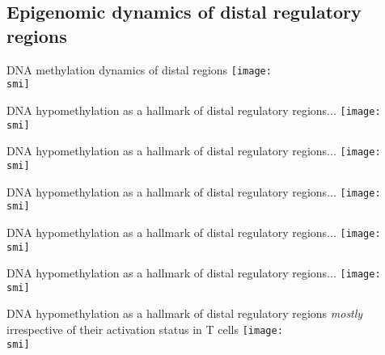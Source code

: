 \documentclass[10pt]{beamer}
\def\smi{out/ln/updir/mw-gcthesis-oral/library.bib}
\begin{document}
\subsection{Epigenomic dynamics of distal regulatory regions}
\begin{frame}{DNA methylation dynamics of distal regions}
  \def\smi{out/ln/updir/mw-gcthesis-oral/ink/hypometh-clusters/1.pdf}
  \texttt{[image: \\smi]}
\end{frame}
\begin{frame}{DNA hypomethylation as a hallmark of distal regulatory regions...}
  \def\smi{out/ln/updir/mw-gcthesis-oral/ink/hypometh-clusters/2.pdf}
  \texttt{[image: \\smi]}%
\end{frame}
\begin{frame}{DNA hypomethylation as a hallmark of distal regulatory regions...}
  \def\smi{out/ln/updir/mw-gcthesis-oral/ink/hypometh-clusters/3.pdf}
  \texttt{[image: \\smi]}
\end{frame}
\begin{frame}{DNA hypomethylation as a hallmark of distal regulatory regions...}
  \def\smi{out/ln/updir/mw-gcthesis-oral/ink/hypometh-clusters/4.pdf}
  \texttt{[image: \\smi]}
\end{frame}
\begin{frame}{DNA hypomethylation as a hallmark of distal regulatory regions...}
  \def\smi{out/ln/updir/mw-gcthesis-oral/ink/hypometh-clusters/5.pdf}
  \texttt{[image: \\smi]}
\end{frame}
\begin{frame}{DNA hypomethylation as a hallmark of distal regulatory regions...}
  \def\smi{out/ln/updir/mw-gcthesis-oral/ink/hypometh-clusters/6.pdf}
  \texttt{[image: \\smi]}
\end{frame}
\begin{frame}{DNA hypomethylation as a hallmark of distal regulatory regions \emph{mostly} irrespective of their activation status in T cells}
  \def\smi{out/ln/updir/mw-gcthesis-oral/ink/h3k27ac-clusters/1.pdf}
  \texttt{[image: \\smi]}%
\end{frame}
\end{document}
